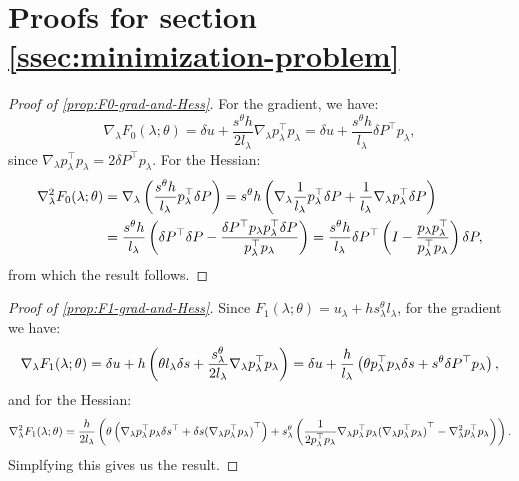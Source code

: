 \documentclass[eikonal.tex]{subfiles}
\begin{document}
\section{Proofs for section
  \ref{ssec:minimization-problem}}\label{sec:minimization-proofs}

\begin{proof}[Proof of \cref{prop:F0-grad-and-Hess}]
  For the gradient, we have:
  \begin{equation*}
    \nabla_\lambda F_0(\lambda; \theta) = \delta u + \frac{s^{\theta} h}{2 l_\lambda} \nabla_\lambda p_\lambda^\top p_\lambda = \delta u + \frac{s^{\theta} h}{l_\lambda} \delta P^\top p_\lambda,
  \end{equation*}
  since
  $\nabla_\lambda p_\lambda^\top p_\lambda = 2 \delta P^\top
  p_\lambda$. For the Hessian:
  \begin{align*}
    \nabla^2_\lambda F_0(\lambda; \theta) &= \nabla_\lambda \left(\frac{s^{\theta} h}{l_\lambda} p_\lambda^\top \delta P\right) = s^{\theta} h \left(\nabla_\lambda \frac{1}{l_\lambda} p_\lambda^\top \delta P + \frac{1}{l_\lambda} \nabla_\lambda p_\lambda^\top \delta P\right) \\
    &= \frac{s^{\theta} h}{l_\lambda} \left(\delta P^\top \delta P - \frac{\delta P^\top p_\lambda p_\lambda^\top \delta P}{p_\lambda^\top p_\lambda}\right) = \frac{s^{\theta} h}{l_\lambda} \delta P^\top \left(I - \frac{p_\lambda p_\lambda^\top}{p_\lambda^\top p_\lambda}\right) \delta P,
  \end{align*}
  from which the result follows.
\end{proof}

\begin{proof}[Proof of \cref{prop:F1-grad-and-Hess}]
  Since $F_1(\lambda; \theta) = u_\lambda + h s^{\theta}_\lambda l_\lambda$, for the gradient we have:
  \begin{equation*}
    \nabla_\lambda F_1(\lambda; \theta) = \delta u + h \left(\theta l_\lambda \delta s + \frac{s^{\theta}_\lambda}{2l_\lambda} \nabla_\lambda p_\lambda^\top p_\lambda\right) = \delta u + \frac{h}{l_\lambda} \left(\theta p_\lambda^\top p_\lambda \delta s + s^{\theta} \delta P^\top p_\lambda\right),
  \end{equation*}
  and for the Hessian:
  \begin{equation*}
    \nabla_\lambda^2 F_1(\lambda; \theta) = \frac{h}{2 l_\lambda} \left(\theta \left(\nabla_\lambda p_\lambda^\top p_\lambda \delta s^\top + \delta s {(\nabla_\lambda p_\lambda^\top p_\lambda)}^\top\right) + s^{\theta}_\lambda \left(\frac{1}{2 p_\lambda^\top p_\lambda} \nabla_\lambda p_\lambda^\top p_\lambda {(\nabla_\lambda p_\lambda^\top p_\lambda)}^\top - \nabla^2_\lambda p_\lambda^\top p_\lambda\right)\right).
  \end{equation*}
  Simplfying this gives us the result.
\end{proof}
\end{document}
